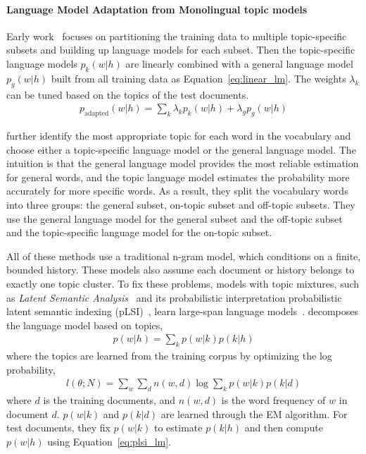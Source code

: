 \paragraph{Language Model Adaptation from Monolingual topic models}

Early work~\citep{Clarkson-1997,Seymore-1997,Kneser-1997,Iyer-1999} focuses on
partitioning the training data to multiple topic-specific subsets and
building up language models for each subset. Then the topic-specific
language models $p_k(w|h)$ are linearly combined with a general
language model $p_g(w|h)$ built from all training data as
Equation~\ref{eq:linear_lm}. The weights $\lambda_k$ can be tuned
based on the topics of the test documents.
\begin{align}
\label{eq:linear_lm}
p_\textrm{adapted}(w|h) = \sum_k \lambda_k p_k(w|h) + \lambda_g p_g(w|h)
\end{align}

\citet{Seymore-1998} further identify the most appropriate topic for
each word in the vocabulary and choose either a topic-specific language model
or the general language model. The intuition is that the general
language model provides the most reliable estimation for general
words, and the topic language model estimates the probability more
accurately for more specific words. As a result, they split the vocabulary
words into three groups: the general subset, on-topic subset and
off-topic subsets. They use the general language model for the general subset and the off-topic subset and the topic-specific language model for  the
on-topic subset.

All of these methods use a traditional n-gram model, which conditions on a finite, bounded history.
These models also assume each document or history belongs
to exactly one topic cluster.
To fix these problems, models with topic mixtures, such as
\emph{Latent Semantic Analysis}~\citep[\textsc{lsa}]{deerwester-90}
and its probabilistic interpretation probabilistic latent semantic
indexing (pLSI)~\citep[\textsc{plsi}]{hofmann-99},
learn large-span language
models~\citep{Bellegarda-1997,Coccaro-1998,Gildea-1999}. \citet{Gildea-1999}
decomposes the language model based on topics,
\begin{align}
\label{eq:plsi_lm}
p(w|h) = \sum_k p(w|k) p(k|h)
\end{align}
where the topics are learned from the training corpus by optimizing the log probability,
\begin{align}
l(\theta; N) = \sum_w \sum_d n(w,d) \log \sum_k p(w|k) p(k|d)
\end{align}
where $d$ is the training documents, and $n(w,d)$ is the word frequency of $w$ in document $d$. $p(w|k)$ and $p(k|d)$ are learned through the EM algorithm. For test documents, they fix $p(w|k)$ to estimate $p(k|h)$ and then compute $p(w|h)$ using Equation~\ref{eq:plsi_lm}. 

